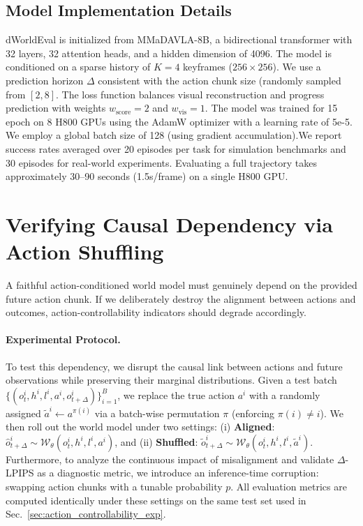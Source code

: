 \subsection{Model Implementation Details}
dWorldEval is initialized from MMaDAVLA-8B, a bidirectional transformer with 32 layers, 32 attention heads, and a hidden dimension of 4096. 
The model is conditioned on a sparse history of $K=4$ keyframes ($256 \times 256$). 
We use a prediction horizon $\Delta$ consistent with the action chunk size (randomly sampled from {$[2, 8]$}.
The loss function balances visual reconstruction and progress prediction with weights $w_{\text{score}}=2$ and $w_{\text{vis}}=1$. 
The model was trained for 15 epoch on 8 H800 GPUs using the AdamW optimizer with a learning rate of 5e-5.
We employ a global batch size of 128 (using gradient accumulation).We report success rates averaged over 20 episodes per task for simulation benchmarks and 30 episodes for real-world experiments.
Evaluating a full trajectory takes approximately 30--90 seconds (1.5s/frame) on a single H800 GPU.

\section{Verifying Causal Dependency via Action Shuffling}
\label{app:action_shuffle}

A faithful action-conditioned world model must genuinely depend on the provided future action chunk. 
If we deliberately destroy the alignment between actions and outcomes, action-controllability indicators should degrade accordingly.

\paragraph{Experimental Protocol.}
To test this dependency, we disrupt the causal link between actions and future observations while preserving their marginal distributions. 
Given a test batch $\{(o^i_t, h^i, l^i, a^i, o^i_{t+\Delta})\}_{i=1}^B$, we replace the true action $a^i$ with a randomly assigned $\tilde{a}^i \leftarrow a^{\pi(i)}$ via a batch-wise permutation $\pi$ (enforcing $\pi(i)\neq i$). 
We then roll out the world model under two settings:
(i) \textbf{Aligned}: $\hat{o}^i_{t+\Delta} \sim \mathcal{W}_\theta(o^i_t, h^i, l^i, a^i)$, and
(ii) \textbf{Shuffled}: $\tilde{o}^i_{t+\Delta} \sim \mathcal{W}_\theta(o^i_t, h^i, l^i, \tilde{a}^i)$.
Furthermore, to analyze the continuous impact of misalignment and validate $\Delta$-LPIPS as a diagnostic metric, we introduce an inference-time corruption: swapping action chunks with a tunable probability $p$. 
All evaluation metrics are computed identically under these settings on the same test set used in Sec.~\ref{sec:action_controllability_exp}.


